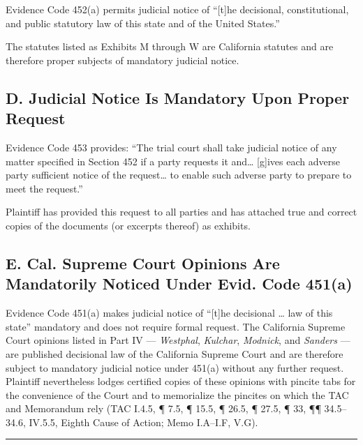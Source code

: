 Evidence Code \textsection{} 452(a) permits judicial notice of ``{[}t{]}he decisional, constitutional, and public statutory law of this state and of the United States.''

The statutes listed as Exhibits M through W are California statutes and are therefore proper subjects of mandatory judicial notice.

\subsection{D. Judicial Notice Is Mandatory Upon Proper Request}\label{d.-judicial-notice-is-mandatory-upon-proper-request}

Evidence Code \textsection{} 453 provides: ``The trial court shall take judicial notice of any matter specified in Section 452 if a party requests it and\ldots{} {[}g{]}ives each adverse party sufficient notice of the request\ldots{} to enable such adverse party to prepare to meet the request.''

Plaintiff has provided this request to all parties and has attached true and correct copies of the documents (or excerpts thereof) as exhibits.

\subsection{E. Cal. Supreme Court Opinions Are Mandatorily Noticed Under Evid. Code \textsection{} 451(a)}\label{e.-cal.-supreme-court-opinions-are-mandatorily-noticed-under-evid.-code-451a}

Evidence Code \textsection{} 451(a) makes judicial notice of ``{[}t{]}he decisional \ldots{} law of this state'' mandatory and does not require formal request. The California Supreme Court opinions listed in Part IV --- \emph{Westphal}, \emph{Kulchar}, \emph{Modnick}, and \emph{Sanders} --- are published decisional law of the California Supreme Court and are therefore subject to mandatory judicial notice under \textsection{} 451(a) without any further request. Plaintiff nevertheless lodges certified copies of these opinions with pincite tabs for the convenience of the Court and to memorialize the pincites on which the TAC and Memorandum rely (TAC \textsection{}I.4.5, ¶ 7.5, ¶ 15.5, ¶ 26.5, ¶ 27.5, ¶ 33, ¶¶ 34.5--34.6, \textsection{}IV.5.5, Eighth Cause of Action; Memo \textsection{}\textsection{} I.A--I.F, V.G).

\begin{center}\rule{0.5\linewidth}{0.5pt}\end{center}


